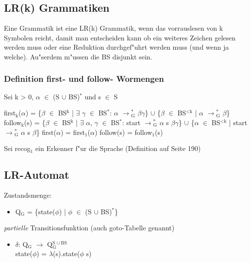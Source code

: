 \documentclass[11pt]{article}
\begin{document}
\subsection{LR(k) Grammatiken}
\label{sec-7-1}
Eine Grammatik ist eine LR(k) Grammatik, wenn das vorrauslesen von k Symbolen reicht, damit man entscheiden kann ob ein weiteres 
Zeichen gelesen werden muss oder eine Reduktion durchgef"uhrt werden muss (und wenn ja welche). Au"serdem m"ussen die BS disjunkt sein.

\subsubsection{Definition first- und follow- Wormengen}
\label{sec-7-1-1}
Sei k > 0, $\alpha$ $\in$ (S $\cup$ BS)$^{\text{*}}$ und s $\in$ S
\begin{center}
first$_{\text{k}}$($\alpha$) = \{$\beta$ $\in$ BS$^{\text{k}}$ | $\exists$ $\gamma$ $\in$ BS$^{\text{*}}$: $\alpha$ $\to$$^{\text{*}}_{\text{G}}$ $\beta$$\gamma$\} $\cup$ \{$\beta$ $\in$ BS$^{\text{<k}}$ | $\alpha$ $\to$$^{\text{*}}_{\text{G}}$ $\beta$\}
follow$_{\text{k}}$(s) = \{$\beta$ $\in$ BS$^{\text{k}}$ | $\exists$ $\alpha$, $\gamma$ $\in$ BS$^{\text{*}}$: start $\to$$^{\text{*}}_{\text{G}}$ $\alpha$ s $\beta$$\gamma$\} $\cup$ \{$\alpha$ $\in$ BS$^{\text{<k}}$ | start $\to$$^{\text{*}}_{\text{G}}$ $\alpha$ s $\beta$\}
first($\alpha$) = first$_{\text{1}}$($\alpha$)
follow(s) = follow$_{\text{1}}$(s)
\end{center}

Sei recog$_{\text{1}}$ ein Erkenner f"ur die Sprache (Definition auf Seite 190)

\subsection{LR-Automat}
\label{sec-7-2}
Zustandsmenge:
\begin{itemize}
\item Q$_{\text{G}}$ = \{state($\phi$) | $\phi$ $\in$ (S $\cup$ BS)$^{\text{*}}$\}
\end{itemize}

\emph{partielle} Transitionsfunktion (auch goto-Tabelle genannt) 
\begin{itemize}
\item $\delta$: Q$_{\text{G}}$ $\to$ Q$_{\text{G}}^{\text{S }\cup\ \text{BS}}$ \\ state($\phi$) = $\lambda$(s).state($\phi$ s)
\end{itemize}
\end{document}

